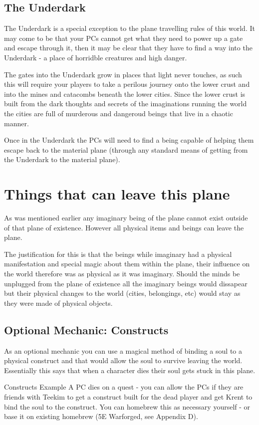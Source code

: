 \documentclass[10pt,twoside,twocolumn]{article}
\begin{document}
\subsection{The Underdark}
The Underdark is a special exception to the plane travelling rules of this world. It may come to be that your PCs cannot get what they need to power up a gate and escape through it, then it may be clear that they have to find a way into the Underdark - a place of horridble creatures and high danger.

The gates into the Underdark grow in places that light never touches, as such this will require your players to take a perilous journey onto the lower crust and into the mines and catacombs beneath the lower cities. Since the lower crust is built from the dark thoughts and secrets of the imaginations running the world the cities are full of murderous and dangeroud beings that live in a chaotic manner.

Once in the Underdark the PCs will need to find a being capable of helping them escape back to the material plane (through any standard means of getting from the Underdark to the material plane).

\section{Things that can leave this plane}
As was mentioned earlier any imaginary being of the plane cannot exist outside of that plane of existence. However all physical items and beings can leave the plane.

The justification for this is that the beings while imaginary had a physical manifestation and special magic about them within the plane, their influence on the world therefore was as physical as it was imaginary. Should the minds be unplugged from the plane of existence all the imaginary beings would dissapear but their physical changes to the world (cities, belongings, etc) would stay as they were made of physical objects.

\subsection{Optional Mechanic: Constructs}
As an optional mechanic you can use a magical method of binding a soul to a physical construct and that would allow the soul to survive leaving the world. Essentially this says that when a character dies their soul gets stuck in this plane.

\begin{paperbox}{Constructs Example}
A PC dies on a quest - you can allow the PCs if they are friends with Teekim to get a construct built for the dead player and get Krent to bind the soul to the construct. You can homebrew this as necessary yourself - or base it on existing homebrew (5E Warforged, see Appendix D).
\end{paperbox}
\end{document}
